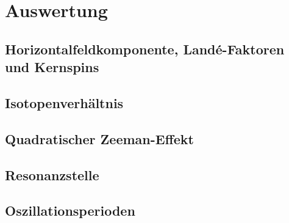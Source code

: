 \section{Auswertung}
\label{sec:Auswertung}

\subsection{Horizontalfeldkomponente, Landé-Faktoren und Kernspins}

\subsection{Isotopenverhältnis}


\subsection{Quadratischer Zeeman-Effekt}

\subsection{Resonanzstelle}

\subsection{Oszillationsperioden}
